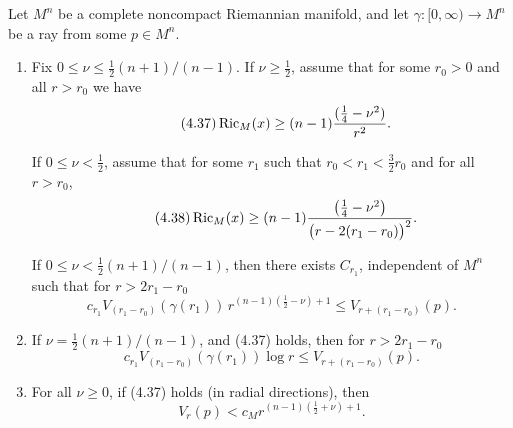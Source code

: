 \begin{theorem}
\label{thm:asymptotic-ricci-volume-growth}
Let $M^n$ be a complete noncompact Riemannian manifold, and let
$\gamma:[0,\infty)\to M^n$ be a ray from some $p\in M^n$.
\begin{enumerate}
\item[(i)] Fix $0\le \nu\le \tfrac12(n+1)/(n-1)$. If $\nu\ge \tfrac12$, assume
that for some $r_0>0$ and all $r>r_0$ we have
\begin{equation}
\tag{4.37}
\operatorname{Ric}_M(x)\ge (n-1)\frac{(\frac14-\nu^2)}{r^2}.
\end{equation}

If $0 \leq \nu < \frac12$, assume that for some $r_1$ such that $r_0 < r_1 <
\frac32 r_0$ and for all $r > r_0$,
\begin{equation}\tag{4.38}
\operatorname{Ric}_M(x) \geq (n-1)\frac{\left(\frac14-\nu^2\right)}{\bigl(r-2(r_1-r_0)\bigr)^2}.
\end{equation}

If $0 \leq \nu < \frac12 (n+1)/(n-1)$, then there exists $C_{r_1}$,
independent of $M^n$ such that for $r > 2r_1-r_0$
\begin{equation}\tag{4.39}
c_{r_1}V_{(r_1-r_0)}(\gamma(r_1))\,r^{(n-1)(\frac12-\nu)+1} \leq V_{r+(r_1-r_0)}(p).
\end{equation}

\item[(ii)] If $\nu = \frac12 (n+1)/(n-1)$, and (4.37) holds, then for
$r > 2r_1-r_0$
\begin{equation}\tag{4.40}
c_{r_1}V_{(r_1-r_0)}(\gamma(r_1))\log r \leq V_{r+(r_1-r_0)}(p).
\end{equation}

\item[(iii)] For all $\nu \geq 0$, if (4.37) holds (in radial directions), then
\begin{equation}\tag{4.41}
V_r(p) < c_M r^{(n-1)(\frac12+\nu)+1}.
\end{equation}
\end{enumerate}
\end{theorem}

